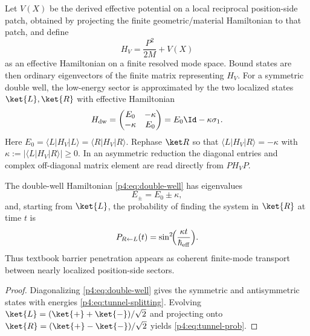 \documentclass[12pt,a4paper]{article}
\begin{document}
Let $V(X)$ be the derived effective potential on a local reciprocal position-side patch, obtained by projecting the finite geometric/material Hamiltonian to that patch, and define
\begin{equation}
\label{p4:eq:well-H}
H_{V}=\frac{P^2}{2M}+V(X)
\end{equation}
as an effective Hamiltonian on a finite resolved mode space.
Bound states are then ordinary eigenvectors of the finite matrix representing $H_V$.
For a symmetric double well, the low-energy sector is approximated by the two localized states $\ket{L},\ket{R}$ with effective Hamiltonian
\begin{equation}
\label{p4:eq:double-well}
H_{\mathrm{dw}}=
\begin{pmatrix}
E_0 & -\kappa \\
-\kappa & E_0
\end{pmatrix}
=E_0\Id-\kappa\sigma_1.
\end{equation}
Here \(E_0=\langle L|H_V|L\rangle=\langle R|H_V|R\rangle\).
Rephase \(\ket R\) so that
\(\langle L|H_V|R\rangle=-\kappa\) with
\(\kappa:=|\langle L|H_V|R\rangle|\ge0\).  In an asymmetric reduction the
diagonal entries and complex off-diagonal matrix element are read directly
from \(P H_VP\).

\begin{proposition}
\label{p4:prop:tunnel-splitting}
The double-well Hamiltonian \eqref{p4:eq:double-well} has eigenvalues
\begin{equation}
\label{p4:eq:tunnel-splitting}
E_{\pm}=E_0\pm \kappa,
\end{equation}
and, starting from $\ket{L}$, the probability of finding the system in $\ket{R}$ at time $t$ is
\begin{equation}
\label{p4:eq:tunnel-prob}
P_{R\leftarrow L}(t)=\sin^2\!\Bigl(\frac{\kappa t}{\hbar_{\mathrm{eff}}}\Bigr).
\end{equation}
Thus textbook barrier penetration appears as coherent finite-mode transport between nearly localized position-side sectors.
\end{proposition}

\begin{proof}
Diagonalizing \eqref{p4:eq:double-well} gives the symmetric and antisymmetric states with energies \eqref{p4:eq:tunnel-splitting}.
Evolving $\ket{L}=(\ket{+}+\ket{-})/\sqrt2$ and projecting onto $\ket{R}=(\ket{+}-\ket{-})/\sqrt2$ yields \eqref{p4:eq:tunnel-prob}.
\end{proof}
\end{document}
